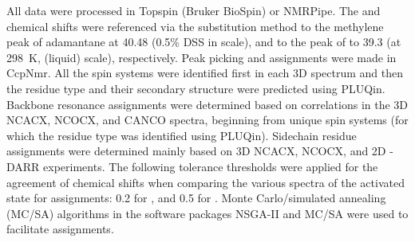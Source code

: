 \documentclass[%
 aip,
 amsmath,amssymb,
 preprint,%
]{revtex4-1}
\begin{document}
All data were processed in Topspin (Bruker BioSpin) or NMRPipe.\cite{Delaglio1995} The  and  chemical shifts were referenced via the substitution method to the methylene peak of adamantane at \SI{40.48}{\ppm} (0.5\% DSS in  scale), and to the peak of   to \SI{39.3 }{\ppm} (at \SI{298}{\kelvin},  (liquid) scale), respectively.\cite{Morcombe2003,McDermott2007,Harris2008,Bertani2014} Peak picking and assignments were made in CcpNmr.\cite{Vranken2005} All the spin systems were identified first in each 3D spectrum and then the residue type and their secondary structure were predicted using PLUQin.\cite{Fritzsching2016} Backbone resonance assignments were determined based on correlations in the 3D NCACX, NCOCX, and CANCO spectra, beginning from unique spin systems (for which the residue type was identified using PLUQin). Sidechain residue assignments were determined mainly based on 3D NCACX, NCOCX, and 2D - DARR experiments. The following tolerance thresholds were applied for the agreement of chemical shifts when comparing the various spectra of the activated state for assignments: \SI{0.2}{\ppm} for , and \SI{0.5}{\ppm} for . Monte Carlo/simulated annealing (MC/SA) algorithms in the software packages NSGA-II and MC/SA were used to facilitate assignments.\cite{Yang2013}
\end{document}
